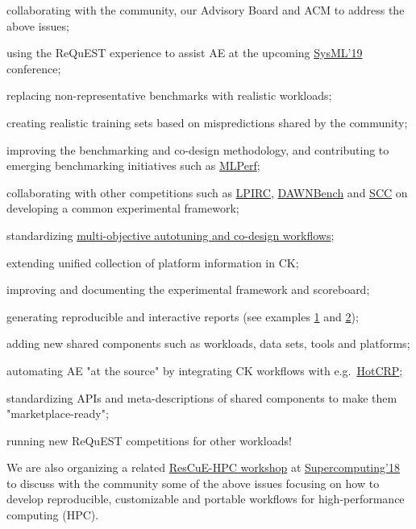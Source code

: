 \documentclass[10pt,onecolumn]{article}
\newenvironment{packed_itemize}{
\begin{itemize}
  \setlength{\itemsep}{1pt}
  \setlength{\parskip}{0pt}
  \setlength{\parsep}{0pt}
}{\end{itemize}}
\begin{document}
\begin{packed_itemize}

\item collaborating with the community, our Advisory Board and ACM to address the above issues;
\item using the ReQuEST experience to assist AE at the upcoming \href{http://sysml.cc}{SysML'19} conference;
\item replacing non-representative benchmarks with realistic workloads;
\item creating realistic training sets based on mispredictions shared by the community;
\item improving the benchmarking and co-design methodology, and contributing to emerging benchmarking initiatives such as \href{http://mlperf.org}{MLPerf};
\item collaborating with other competitions such as \href{https://rebootingcomputing.ieee.org/lpirc}{LPIRC}, \href{https://dawn.cs.stanford.edu/benchmark}{DAWNBench} and \href{https://sc18.supercomputing.org/experience/studentssc/student-cluster-competition}{SCC} on developing a common experimental framework;
\item standardizing \href{http://cKnowledge.org/rpi-crowd-tuning}{multi-objective autotuning and co-design workflows};
\item extending unified collection of platform information in CK;
\item improving and documenting the experimental framework and scoreboard;
\item generating reproducible and interactive reports (see examples \href{http://cknowledge.org/repo/web.php?wcid=report:request-overview}{1} and \href{http://cKnowledge.org/rpi-crowd-tuning}{2});
\item adding new shared components such as workloads, data sets, tools and platforms;
\item automating AE "at the source" by integrating CK workflows with e.g.\ \href{https://hotcrp.com/}{HotCRP};
\item standardizing APIs and meta-descriptions of shared components to make them "marketplace-ready";
\item running new ReQuEST competitions for other workloads!

\end{packed_itemize}

We are also organizing a related \href{http://rescue-hpc.org}{ResCuE-HPC workshop}
at \href{https://sc18.supercomputing.org/}{Supercomputing'18} to discuss with the community some of the
above issues focusing on how to develop reproducible,
customizable and portable workflows for high-performance
computing (HPC).
\end{document}
